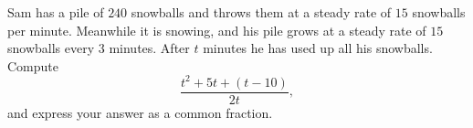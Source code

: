 Sam has a pile of $240$ snowballs and throws them at a steady rate of $15$ snowballs per minute. Meanwhile it is snowing, and his pile grows at a steady rate of $15$ snowballs every $3$ minutes. After $t$ minutes he has used up all his snowballs. Compute
\[
\dfrac{t^2+5t+(t-10)}{2t},
\]
and express your answer as a common fraction.
